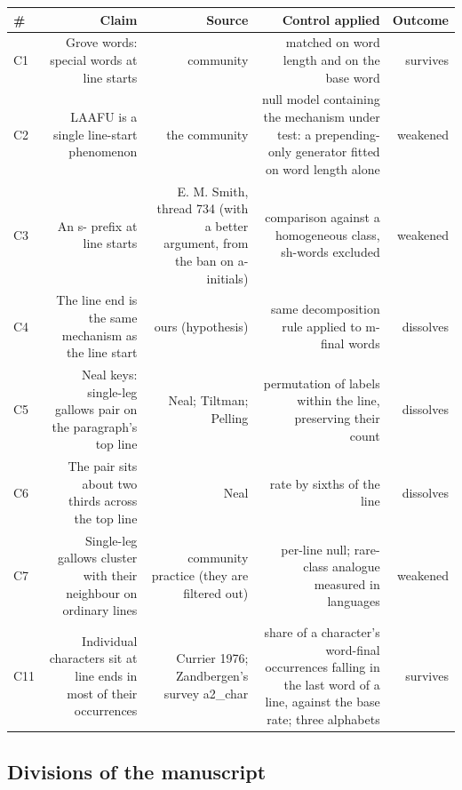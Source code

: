 \documentclass[11pt,a4paper]{article}
\begin{document}
\begin{table}[htbp]\centering\small
\begin{tabular}{@{}lrrrr@{}}
\toprule
\# & Claim & Source & Control applied & Outcome \\
\midrule
C1 & Grove words: special words at line starts & community & matched on word length and on the base word & survives \\
C2 & LAAFU is a single line-start phenomenon & the community & null model containing the mechanism under test: a prepending-only generator fitted on word length alone & weakened \\
C3 & An s- prefix at line starts & E. M. Smith, thread 734 (with a better argument, from the ban on a-initials) & comparison against a homogeneous class, sh-words excluded & weakened \\
C4 & The line end is the same mechanism as the line start & ours (hypothesis) & same decomposition rule applied to m-final words & dissolves \\
C5 & Neal keys: single-leg gallows pair on the paragraph's top line & Neal; Tiltman; Pelling & permutation of labels within the line, preserving their count & dissolves \\
C6 & The pair sits about two thirds across the top line & Neal & rate by sixths of the line & dissolves \\
C7 & Single-leg gallows cluster with their neighbour on ordinary lines & community practice (they are filtered out) & per-line null; rare-class analogue measured in languages & weakened \\
C11 & Individual characters sit at line ends in most of their occurrences & Currier 1976; Zandbergen's survey a2\_char & share of a character's word-final occurrences falling in the last word of a line, against the base rate; three alphabets & survives \\
\bottomrule
\end{tabular}
\end{table}

\subsection*{Divisions of the manuscript}
\end{document}
